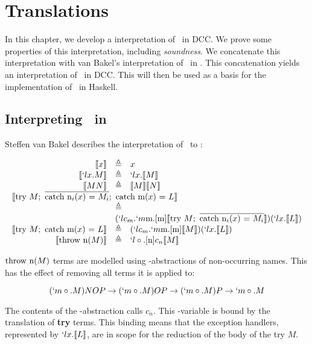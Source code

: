 \chapter{Translations}

In this chapter, we develop a interpretation of \lmu\ in DCC.
We prove some properties of this interpretation, including \emph{soundness}.
We concatenate this interpretation with van Bakel's interpretation of \ltry\ in \lmu.
This concatenation yields an interpretation of \ltry\ in DCC.
This will then be used as a basis for the implementation of \ltry\ in Haskell.

\section{Interpreting \ltry\ in \lmu}

Steffen van Bakel describes the interpretation of \ltry\ to \lmu:

\[
  \begin{array}{rcl}
    \tr{x} &\triangleq& x \\
    \tr{`lx.M} &\triangleq& `lx.\tr{M} \\
    \tr{M N} &\triangleq& \tr{M}\tr{N} \\
    \multicolumn{3}{l}{\tr{\try M;\ \mcatch;\ \catch{m($x$) = $L$}}} \\
    & \triangleq & \\
    &\multicolumn{2}{l}{ (`lc_m.`m\text{m}.[\text{m}]\tr{\try M;\ \mcatch})(`lx.\tr{L})} \\
    
    \tr{\try M;\ \catch{m($x$) = $L$}} & \triangleq & (`lc_m.`m\text{m}.[\text{m}]\tr{M})(`lx.\tr{L}) \\
    \tr{\throw{n($M$)}} &\triangleq& `l\nonocc.[\text{n}]c_n\tr{M}
  \end{array}
\]

$\text{throw n($M$)}$ terms are modelled using \lmu-abstractions of non-occurring names. This has the effect of removing all terms it is applied to:

\[
  (`m\circ.M)NOP \to (`m\circ.M)OP \to (`m\circ.M)P \to `m\circ.M
\]

The contents of the \lmu-abstraction calls $c_n$.
This \lam-variable is bound by the translation of \textbf{try} terms.
This binding means that the exception handlers, represented by $`lx.\llbracket L \rrbracket$,
are in scope for the reduction of the body of the try $M$.


